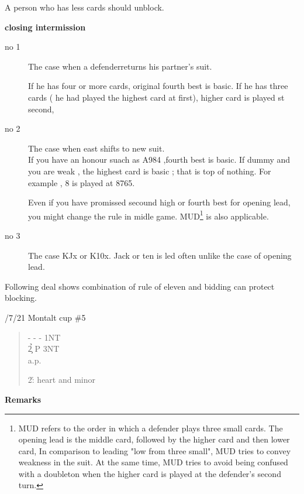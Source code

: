 A person who has less cards should unblock.
 
\vspace {0.5cm}
{\bf closing intermission}\\
\begin{description}
\item[no 1]{

The case when a defenderreturns his partner's
suit.

If he has four or more cards, original fourth best is
basic. If he has three cards ( he had played the highest card
at first),
higher card is played st second,


}
\item[no 2]{ The case when east shifts to new suit.\\
If you have an honour suach  as A984 ,fourth best is basic.
If dummy and you are weak , the highest card is basic ; that is
top of nothing.  For example , 8 is played at 8765.

Even if you have promissed  secound high or fourth best for 
opening lead, you might change the rule in midle game.
MUD\footnote{
MUD refers to the order in which a defender plays three small cards. The opening lead is the middle card, followed by the higher card and then lower card, In comparison to leading "low from three small", MUD tries to convey weakness in the suit. At the same time, MUD tries to avoid being confused with a doubleton when the higher card is played at the defender's second turn.}
is also applicable. 
}

\item[no 3]{ The case KJx or K10x.
Jack or ten is led often unlike the case of opening lead.

}
\end{description}

\vspace{0.5cm}

Following deal shows combination of rule of eleven and 
bidding can protect blocking.

/7/21 Montalt cup \#5
\begin{quote}
%
  {}%
  {}
  {}%
  {}%
\end{quote}
\begin{quote}
\begin{bidding}
- \> -  \> - \> 1NT  \\
2\h  {}\c \> P \> 3NT\\
a.p.
\end{bidding}
2\h : heart and minor
\end{quote}
{\bf Remarks}\\

